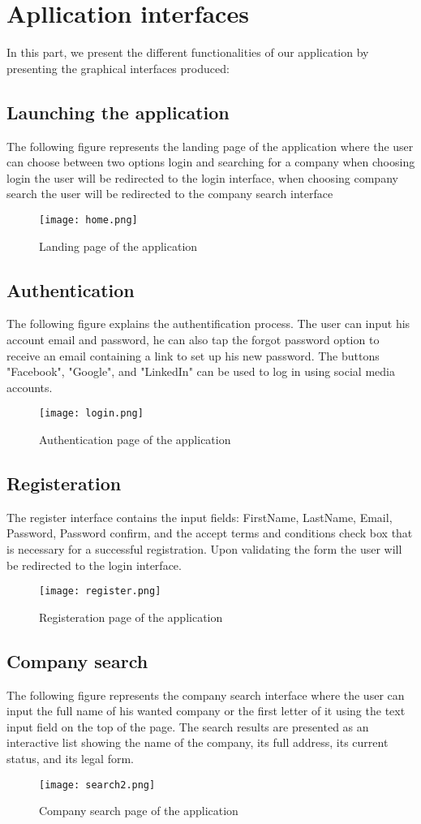 \section{Apllication interfaces}
In this part, we present the different functionalities of our
application by presenting the graphical interfaces produced:
\subsection{Launching the application}
The following figure represents the landing page of the application where the user can choose between two options login and searching for a company when choosing login the user will be redirected to the login interface, when choosing company search the user will be redirected to the company search interface 
\begin{figure}[H]%
    \center   
    \texttt{[image: home.png]}
    \caption{Landing page of the application}
\end{figure}
\subsection{Authentication}
The following figure explains the authentification process. The user can input his account email and password, he can also tap the forgot password option to receive an email containing a link to set up his new password.
The buttons "Facebook", "Google", and "LinkedIn" can be used to log in using social media accounts.
\begin{figure}[H]%
    \center   
    \texttt{[image: login.png]}
    \caption{Authentication page of the application}
\end{figure}
\subsection{Registeration}
The register interface contains the input fields: FirstName, LastName, Email, Password, Password confirm, and the accept terms and conditions check box that is necessary for a successful registration. Upon validating the form the user will be redirected to the login interface. 
\begin{figure}[H]%
    \center   
    \texttt{[image: register.png]}
    \caption{Registeration page of the application}
\end{figure}
\subsection{Company search}
The following figure represents the company search interface where the user can input the full name of his wanted company or the first letter of it using the text input field on the top of the page. The search results are presented as an interactive list showing the name of the company, its full address, its current status, and its legal form.  
\begin{figure}[H]%
    \center   
    
    \texttt{[image: search2.png]}
    \caption{Company search page of the application}
\end{figure}
